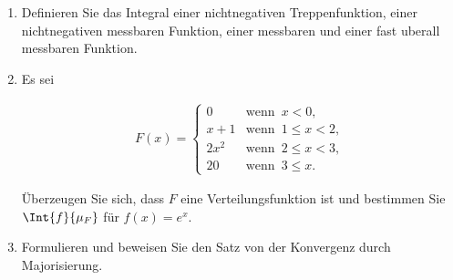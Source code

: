 
\begin{exercise}

\phantom{}

\begin{enumerate}[label = (\alph*)]

  \item
  Definieren Sie das Integral einer nichtnegativen Treppenfunktion, einer nichtnegativen messbaren Funktion, einer messbaren und einer fast uberall messbaren Funktion.
  
  \item
  Es sei
  
  \begin{align*}
    F(x) =
    \begin{cases}
      0     & \text{wenn} \enspace  x < 0, \\
      x + 1 & \text{wenn} \enspace 1 \leq x < 2, \\
      2x^2  & \text{wenn} \enspace 2 \leq x < 3, \\
      20    & \text{wenn} \enspace 3 \leq x.
    \end{cases}
  \end{align*}

  Überzeugen Sie sich, dass $F$ eine Verteilungsfunktion ist und bestimmen Sie $\Int{f}{\mu_F}$ für $f(x) = e^x$.

  \item
  Formulieren und beweisen Sie den Satz von der Konvergenz durch Majorisierung.

\end{enumerate}

\end{exercise}


